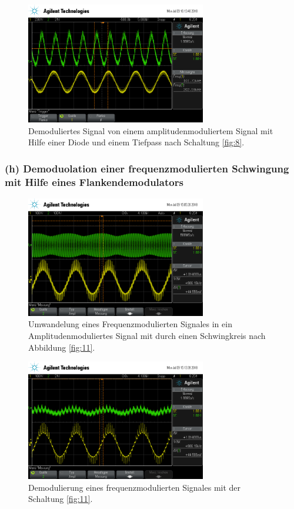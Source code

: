 \begin{figure}
  \centering
  \includegraphics[width=0.7\textwidth]{osci/amp_demod_diode.png}
  \caption{Demoduliertes Signal von einem amplitudenmoduliertem Signal mit Hilfe einer
  Diode und einem Tiefpass nach Schaltung \ref{fig:8}.}
  \label{fig:diode_demod_amp}
\end{figure}



\subsubsection{(h) Demoduolation einer frequenzmodulierten Schwingung
mit Hilfe eines Flankendemodulators}
\label{subsubsec:auswertung_h}

\begin{figure}
  \centering
  \includegraphics[width=0.7\textwidth]{osci/freq_demod_amp.png}
  \caption{Umwandelung eines Frequenzmodulierten Signales in ein Amplitudenmoduliertes
Signal mit durch einen Schwingkreis nach Abbildung \ref{fig:11}.}
\label{fig:freq_zu_amp}
\end{figure}



\begin{figure}
  \centering
  \includegraphics[width=0.7\textwidth]{osci/freq_demod.png}
  \caption{Demodulierung eines frequenzmodulierten Signales
  mit der Schaltung \ref{fig:11}.}
\label{fig:demod_frequenz}
\end{figure}
